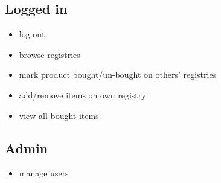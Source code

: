 \documentclass[11pt]{article}
\begin{document}
    \subsection*{Logged in}
    \begin{itemize}
        \item log out
        \item browse registries
        \item mark product bought/un-bought on others' registries
        \item add/remove items on own registry
        \item view all bought items
    \end{itemize}
    \subsection*{Admin}
    \begin{itemize}
        \item manage users
    \end{itemize}
\end{document}
